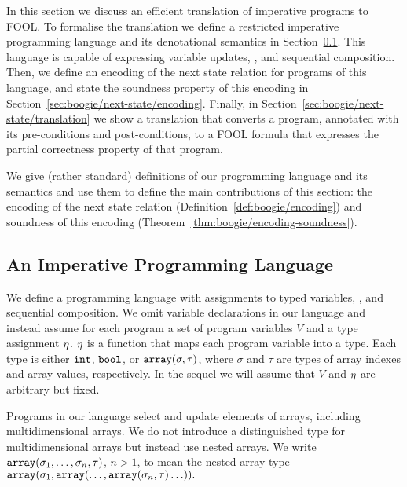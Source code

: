 
In this section we discuss an efficient translation of imperative programs to FOOL. To formalise the translation we define a restricted imperative programming language and its denotational semantics in Section~\ref{sec:boogie/next-state/programming-language}. This language is capable of expressing variable updates, \ITE, and sequential composition. Then, we define an encoding of the next state relation for programs of this language, and state the soundness property of this encoding in Section~\ref{sec:boogie/next-state/encoding}. Finally, in Section~\ref{sec:boogie/next-state/translation} we show a translation that converts a program, annotated with its pre-conditions and post-conditions, to a FOOL formula that expresses the partial correctness property of that program. %

We give (rather standard) definitions of our programming language and its semantics and use them to define the main contributions of this section: the encoding of the next state relation (Definition~\ref{def:boogie/encoding}) and soundness of this encoding (Theorem~\ref{thm:boogie/encoding-soundness}).

\subsection{An Imperative Programming Language}\label{sec:boogie/next-state/programming-language}


We define a programming language with assignments to typed variables, \ITE, and sequential composition. We omit variable declarations in our language and instead assume for each program a set of program variables $V$ and a type assignment $\eta$. $\eta$ is a function that maps each program variable into a type. Each type is either $\mathtt{int}$, $\mathtt{bool}$, or $\mathtt{array}(\sigma,\tau)$, where $\sigma$ and $\tau$ are types of array indexes and array values, respectively. In the sequel we will assume that $V$ and $\eta$ are arbitrary but fixed.

Programs in our language select and update elements of arrays, including multidimensional arrays. We do not introduce a distinguished type for multidimensional arrays but instead use nested arrays. We write $\mathtt{array}(\sigma_1,\ldots,\sigma_n,\tau)$, $n > 1$, to mean the nested array type $\mathtt{array}(\sigma_1,\allowbreak\mathtt{array}(\ldots,\mathtt{array}(\sigma_n,\tau)\ldots)).$

